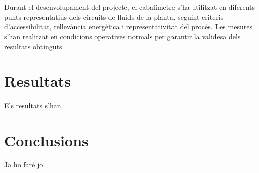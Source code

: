 \documentclass[12pt]{article}
\begin{document}
Durant el desenvolupament del projecte, el cabalímetre s'ha utilitzat en diferents punts representatius dels circuits de fluids de la planta, seguint criteris d'accessibilitat, rellevància energètica i representativitat del procés. Les mesures s'han realitzat en condicions operatives normals per garantir la validesa dels resultats obtinguts.

\section{Resultats}

Els resultats s'han

\section{Conclusions}

Ja ho faré jo


\newpage
\renewcommand{\refname}{Referències}
\printbibliography
\end{document}
